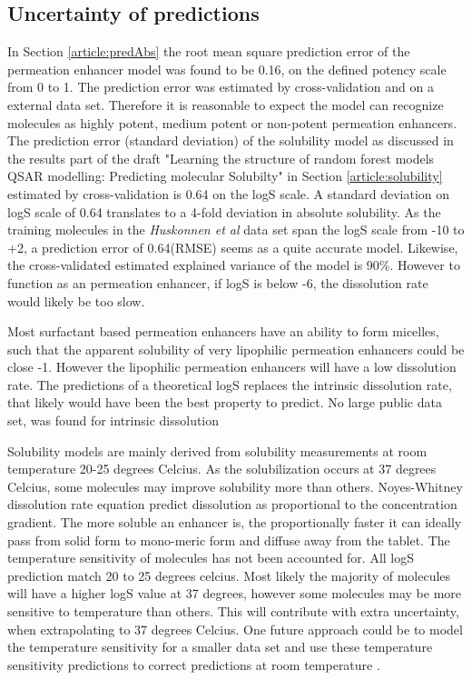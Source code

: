 \subsection{Uncertainty of predictions}
In Section \ref{article:predAbs} the root mean square prediction error of the permeation enhancer model was found to be 0.16, on the defined potency scale from 0 to 1. The prediction error was estimated by cross-validation and on a external data set. Therefore it is reasonable to expect the model can recognize molecules as highly potent, medium potent or non-potent permeation enhancers. The prediction error (standard deviation) of the solubility model as discussed in the results part of the draft "Learning the structure of random forest models QSAR modelling: Predicting molecular Solubilty" in Section \ref{article:solubility} estimated by cross-validation is 0.64 on the logS scale. A standard deviation on logS scale of 0.64 translates to a 4-fold deviation in absolute solubility. As the training molecules in the \textit{Huskonnen et al} data set \cite{palmer2007random} span the logS scale from -10 to +2, a prediction error of 0.64(RMSE) seems as a quite accurate model. Likewise, the cross-validated estimated explained variance of the model is 90\%. However to function as an permeation enhancer, if logS is below -6, the dissolution rate would likely be too slow.

Most surfactant based permeation enhancers have an ability to form micelles, such that the apparent solubility of very lipophilic permeation enhancers could be close -1. However the lipophilic permeation enhancers will have a low dissolution rate. The predictions of a theoretical logS replaces the intrinsic dissolution rate, that likely would have been the best property to predict. No large public data set, was found for intrinsic dissolution

Solubility models \cite{delaney2004esol,palmer2007random} are mainly derived from solubility measurements at room temperature 20-25 degrees Celcius. As the solubilization occurs at 37 degrees Celcius, some molecules may improve solubility more than others. Noyes-Whitney dissolution rate equation predict dissolution as proportional to the concentration gradient. The more soluble an enhancer is, the proportionally faster it can ideally pass from solid form to mono-meric form and diffuse away from the tablet. The temperature sensitivity of molecules has not been accounted for. All logS prediction match 20 to 25 degrees celcius. Most likely the majority of molecules will have a higher logS value at 37 degrees, however some molecules may be more sensitive to temperature than others. This will contribute with extra uncertainty, when extrapolating to 37 degrees Celcius. One future approach could be to model the temperature sensitivity for a smaller data set and use these temperature sensitivity predictions to correct predictions at room temperature \cite{klimenko2016novel}.


